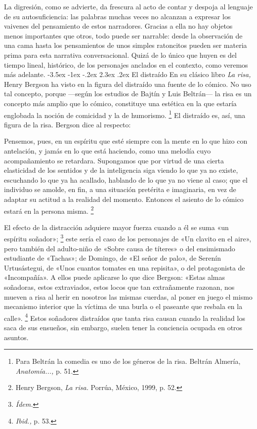\documentclass[14pt,twoside,final]{extbook} %
\makeatletter
\let\oldfootnote\footnote
\renewcommand\footnote[1]{%
\oldfootnote{\hspace{1mm}#1}}
\renewcommand\section{\@startsection {section}{1}{\z@}%
                                     {-3.5ex \@plus -1ex \@minus -.2ex}%
                                     {2.3ex \@plus .2ex}%
                                     {\normalfont\large\bfseries\sc}}
\makeatother
\begin{document}
La digresión, como se advierte, da frescura al acto de contar y despoja al lenguaje de su autosuficiencia: las palabras muchas veces no alcanzan a expresar los vaivenes del pensamiento de estos narradores. Gracias a ella no hay objetos menos importantes que otros, todo puede ser narrable: desde la observación de una cama hasta los pensamientos de unos simples ratoncitos pueden ser materia prima para esta narrativa conversacional. Quizá de lo único que huyen es del tiempo lineal, histórico, de los personajes anclados en el contexto, como veremos más adelante.
\section{El distraído}\label{sec:el-distraido}
En su clásico libro \emph{La risa,} Henry Bergson ha visto en la figura del distraído una fuente de lo cómico. No uso tal concepto, porque ---según los estudios de Bajtín y Luis Beltrán--- la risa es un concepto más amplio que lo cómico, constituye una estética en la que estaría englobada la noción de comicidad y la de humorismo.\footnote{Para Beltrán la comedia es uno de los géneros de la risa. Beltrán Almería, \emph{Anatomía...,} p. 51.} El distraído es, así, una figura de la risa. Bergson dice al respecto:
\begin{quoting}
Pensemos, pues, en un espíritu que esté siempre con la mente en lo que hizo con antelación, y jamás en lo que está haciendo, como una melodía cuyo acompañamiento se retardara. Supongamos que por virtud de una cierta elasticidad de los sentidos y de la inteligencia siga viendo lo que ya no existe, escuchando lo que ya ha acallado, hablando de lo que ya no viene al caso; que el individuo se amolde, en fin, a una situación pretérita e imaginaria, en vez de adaptar su actitud a la realidad del momento. Entonces el asiento de lo cómico estará en la persona misma.\footnote{Henry Bergson, \emph{La risa.} Porrúa, México, 1999, p. 52.}
\end{quoting}
El efecto de la distracción adquiere mayor fuerza cuando a él se suma «un espíritu soñador»;\footnote{\em Ídem.} este sería el caso de los personajes de «Un clavito en el aire», pero también del adulto-niño de «Sobre causa de títeres» o del ensimismado estudiante de «Tachas»; de Domingo, de «El señor de palo», de Serenín Urtusástegui, de «Unos cuantos tomates en una repisita», o del protagonista de «Incompañía». A ellos puede aplicarse lo que dice Bergson: «Estas almas soñadoras, estos extraviados, estos locos que tan extrañamente razonan, nos mueven a risa al herir en nosotros las mismas cuerdas, al poner en juego el mismo mecanismo interior que la víctima de una burla o el paseante que resbala en la calle».\footnote{\emph{Ibid.,} p. 53.} Estos soñadores distraídos que tanta risa causan cuando la realidad los saca de sus ensueños, sin embargo, suelen tener la conciencia ocupada en otros asuntos.
\end{document}
